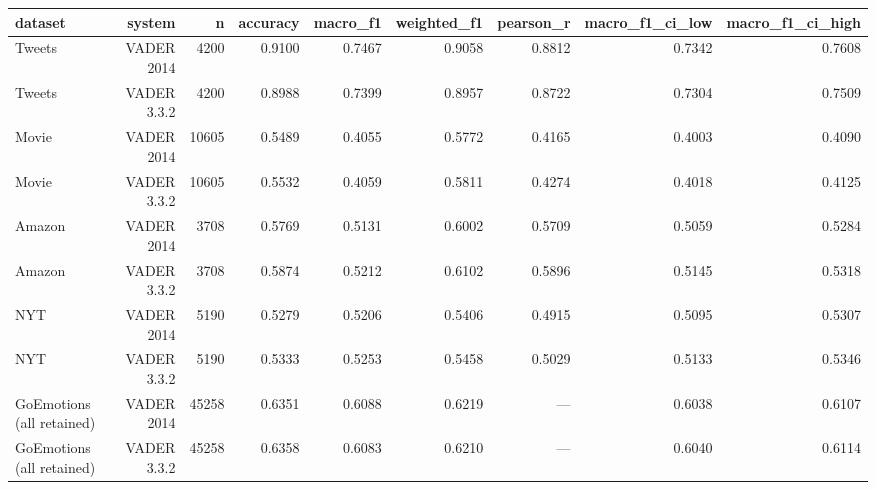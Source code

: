 \begin{tabular}{lrrrrrrrr}
dataset & system & n & accuracy & macro\_f1 & weighted\_f1 & pearson\_r & macro\_f1\_ci\_low & macro\_f1\_ci\_high \\
\hline
Tweets & VADER 2014 & 4200 & 0.9100 & 0.7467 & 0.9058 & 0.8812 & 0.7342 & 0.7608 \\
Tweets & VADER 3.3.2 & 4200 & 0.8988 & 0.7399 & 0.8957 & 0.8722 & 0.7304 & 0.7509 \\
Movie & VADER 2014 & 10605 & 0.5489 & 0.4055 & 0.5772 & 0.4165 & 0.4003 & 0.4090 \\
Movie & VADER 3.3.2 & 10605 & 0.5532 & 0.4059 & 0.5811 & 0.4274 & 0.4018 & 0.4125 \\
Amazon & VADER 2014 & 3708 & 0.5769 & 0.5131 & 0.6002 & 0.5709 & 0.5059 & 0.5284 \\
Amazon & VADER 3.3.2 & 3708 & 0.5874 & 0.5212 & 0.6102 & 0.5896 & 0.5145 & 0.5318 \\
NYT & VADER 2014 & 5190 & 0.5279 & 0.5206 & 0.5406 & 0.4915 & 0.5095 & 0.5307 \\
NYT & VADER 3.3.2 & 5190 & 0.5333 & 0.5253 & 0.5458 & 0.5029 & 0.5133 & 0.5346 \\
GoEmotions (all retained) & VADER 2014 & 45258 & 0.6351 & 0.6088 & 0.6219 & --- & 0.6038 & 0.6107 \\
GoEmotions (all retained) & VADER 3.3.2 & 45258 & 0.6358 & 0.6083 & 0.6210 & --- & 0.6040 & 0.6114 \\
\end{tabular}

